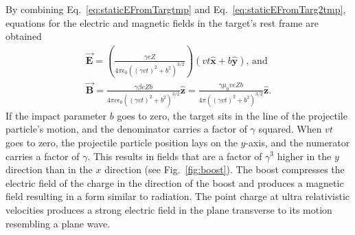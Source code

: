     By combining Eq.~\ref{eq:staticEFromTargtmp} and 
      Eq.~\ref{eq:staticEFromTarg2tmp}, equations for the electric and 
      magnetic fields in the target's rest frame are obtained 
        \begin{eqnarray} \label{eq:ebPframe} 
          \vec{\mathbf{E}}=\left( \frac{\gamma e Z}
           { 4 \pi \epsilon_{0} \left( \left( \gamma v t \right)^{2} 
           + b^{2}\right)^{3/2} }\right)
           \left(vt\mathbf{\hat{x}}+b\mathbf{\hat{y}}\right)\nonumber\textrm{, and} \\
           \vec{\mathbf{B}}=\frac{\gamma\beta e Z b}
           { 4 \pi c \epsilon_{0} \left( \left( \gamma v t \right)^{2} 
           + b^{2}\right)^{3/2} }
           \mathbf{\hat{z}}=
           \frac{\gamma\mu_{0}veZb}{4\pi\left(\left(\gamma v t \right)^{2}
           +b^{2}\right)^{3/2}}\mathbf{\hat{z}}.
        \end{eqnarray}
    If the impact parameter $b$ goes to zero, the target sits in the line of 
      the projectile particle's motion, and the denominator carries a factor of
      $\gamma$ squared. 
    When $vt$ goes to zero, the projectile particle position lays on the 
      $y$-axis, and the numerator carries a factor of $\gamma$. 
    This results in fields that are a factor of $\gamma^3$ higher in the 
      $y$ direction than in the $x$ direction (see Fig.~\ref{fig:boost}).  
    The boost compresses the electric field of the charge 
      in the direction of the boost and produces a magnetic field 
      resulting in a form similar to radiation.
    The point charge at ultra relativistic velocities produces a strong 
      electric field in the plane transverse to its motion resembling a plane 
      wave.
         
